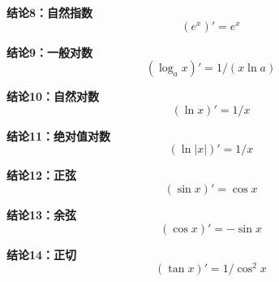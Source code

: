 \begin{statementbox}
\begin{minipage}{\linewidth}
\textbf{结论8：自然指数}
\[
(e^x)'=e^x
\]

\end{minipage}
\end{statementbox}

\begin{statementbox}
\begin{minipage}{\linewidth}
\textbf{结论9：一般对数}
\[
(\log_a x)'=1/(x\ln a)
\]

\end{minipage}
\end{statementbox}

\begin{statementbox}
\begin{minipage}{\linewidth}
\textbf{结论10：自然对数}
\[
(\ln x)'=1/x
\]

\end{minipage}
\end{statementbox}

\begin{statementbox}
\begin{minipage}{\linewidth}
\textbf{结论11：绝对值对数}
\[
(\ln|x|)'=1/x
\]

\end{minipage}
\end{statementbox}

\begin{statementbox}
\begin{minipage}{\linewidth}
\textbf{结论12：正弦}
\[
(\sin x)'=\cos x
\]

\end{minipage}
\end{statementbox}

\begin{statementbox}
\begin{minipage}{\linewidth}
\textbf{结论13：余弦}
\[
(\cos x)'=-\sin x
\]

\end{minipage}
\end{statementbox}

\begin{statementbox}
\begin{minipage}{\linewidth}
\textbf{结论14：正切}
\[
(\tan x)'=1/\cos^2x
\]

\end{minipage}
\end{statementbox}


